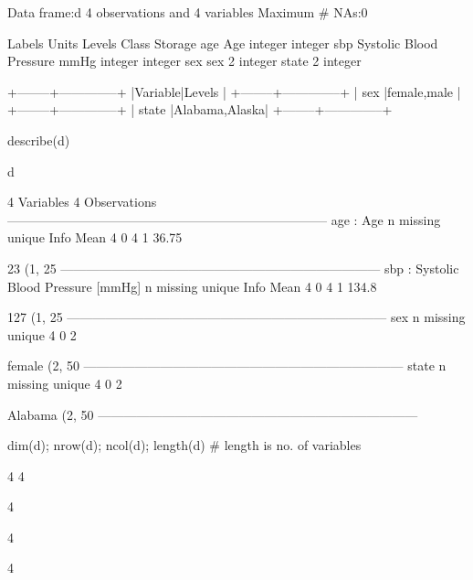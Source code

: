 \begin{Schunk}
\begin{Soutput}
Data frame:d	4 observations and 4 variables    Maximum # NAs:0


                       Labels Units Levels   Class Storage
age                       Age              integer integer
sbp   Systolic Blood Pressure  mmHg        integer integer
sex                       sex            2         integer
state                                    2         integer

+--------+--------------+
|Variable|Levels        |
+--------+--------------+
|  sex   |female,male   |
+--------+--------------+
|  state |Alabama,Alaska|
+--------+--------------+
\end{Soutput}
\begin{Sinput}
describe(d)
\end{Sinput}
\begin{Soutput}
d 

 4  Variables      4  Observations
---------------------------------------------------------------------------
age : Age 
      n missing  unique    Info    Mean 
      4       0       4       1   36.75 

23 (1, 25%
---------------------------------------------------------------------------
sbp : Systolic Blood Pressure [mmHg] 
      n missing  unique    Info    Mean 
      4       0       4       1   134.8 

127 (1, 25%
---------------------------------------------------------------------------
sex 
      n missing  unique 
      4       0       2 

female (2, 50%
---------------------------------------------------------------------------
state 
      n missing  unique 
      4       0       2 

Alabama (2, 50%
---------------------------------------------------------------------------
\end{Soutput}
\begin{Sinput}
dim(d); nrow(d); ncol(d); length(d)  # length is no. of variables
\end{Sinput}
\begin{Soutput}
[1] 4 4
\end{Soutput}
\begin{Soutput}
[1] 4
\end{Soutput}
\begin{Soutput}
[1] 4
\end{Soutput}
\begin{Soutput}
[1] 4
\end{Soutput}
\end{Schunk}


